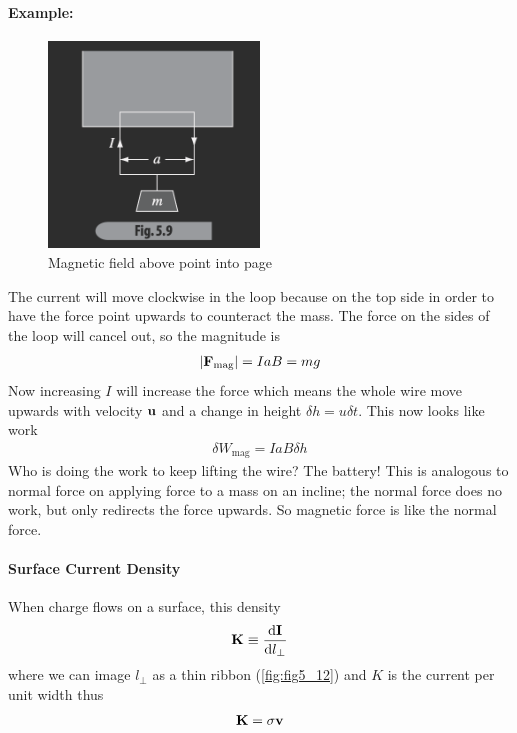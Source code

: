 \documentclass[../main.tex]{subfiles}
\begin{document}
\paragraph{Example:}
\begin{figure}[ht]
    \centering
    \includegraphics[width=0.5\textwidth]{fig5_9.png}
    \caption{Magnetic field above point into page}
    \label{fig:fig5_9}
\end{figure}
The current will move clockwise in the loop because on the top side in order to have the force point upwards to counteract the mass.
The force on the sides of the loop will cancel out, so the magnitude is
\begin{align*}
    \abs{\vb F_\text{mag}} = I a B = mg
\end{align*}
Now increasing $I$ will increase the force which means the whole wire move upwards with velocity $\vb u$ and a change in height $\delta h = u \delta t$.
This now looks like work
\begin{align*}
    \delta W_\text{mag} = I a B \delta h
\end{align*}
Who is doing the work to keep lifting the wire? The battery!
This is analogous to normal force on applying force to a mass on an incline;
the normal force does no work, but only redirects the force upwards. So magnetic force is like the normal force.


\paragraph{Surface Current Density} When charge flows on a surface, this density
\begin{align*}
    \vb K \equiv \dv{\vb I}{l_\perp}
\end{align*}
where we can image $l_\perp$ as a thin ribbon (\ref{fig:fig5_12}) and $K$ is the current per unit width thus
\begin{align*}
    \vb K = \sigma \vb v
\end{align*}
\end{document}

